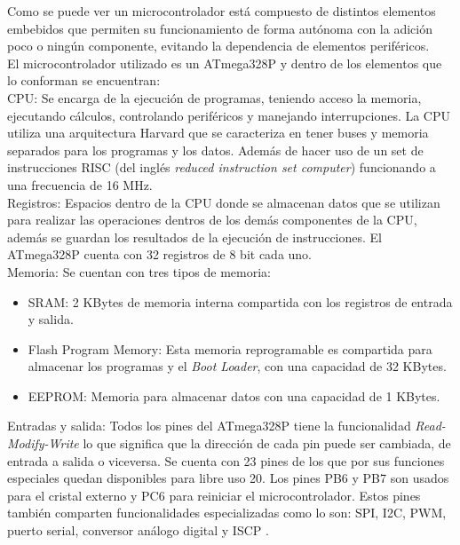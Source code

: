 \documentclass{iccmemoria}
\begin{document}
Como se puede ver un microcontrolador está compuesto de distintos elementos embebidos que permiten su funcionamiento de forma autónoma con la adición poco o ningún componente, evitando la dependencia de elementos periféricos.\\

El microcontrolador utilizado es un ATmega328P y dentro de los elementos que lo conforman se encuentran:\\

CPU: Se encarga de la ejecución de programas, teniendo acceso la memoria, ejecutando cálculos, controlando periféricos y manejando interrupciones. La CPU utiliza una arquitectura Harvard que se caracteriza en tener buses y memoria separados para los programas y los datos. Además de hacer uso de un set de instrucciones RISC (del inglés \emph{reduced instruction set computer}) funcionando a una frecuencia de 16 MHz.\\

Registros: Espacios dentro de la CPU donde se almacenan datos que se utilizan para realizar las operaciones dentros de los demás componentes de la CPU, además se guardan los resultados de la ejecución de instrucciones. El ATmega328P cuenta con 32 registros de 8 bit cada uno.\\

Memoria: Se cuentan con tres tipos de memoria:
\begin{itemize}
    \item SRAM: 2 KBytes de memoria interna compartida con los registros de entrada y salida.
    \item Flash Program Memory: Esta memoria reprogramable es compartida para almacenar los programas y el \emph{Boot
Loader}, con una capacidad de 32 KBytes.
    \item EEPROM: Memoria para almacenar datos con una capacidad de 1 KBytes.
\end{itemize}

Entradas y salida: Todos los pines del ATmega328P tiene la funcionalidad \emph{Read-Modify-Write} lo que significa que la dirección de cada pin puede ser cambiada, de entrada a salida o viceversa. Se cuenta con 23 pines de los que por sus funciones especiales quedan disponibles para libre uso 20. Los pines PB6 y PB7 son usados para el cristal externo y PC6 para reiniciar el microcontrolador. Estos pines también comparten funcionalidades especializadas como lo son: SPI, I2C, PWM, puerto serial, conversor análogo digital y ISCP \cite{atemel:atemega328}.\\
\end{document}
